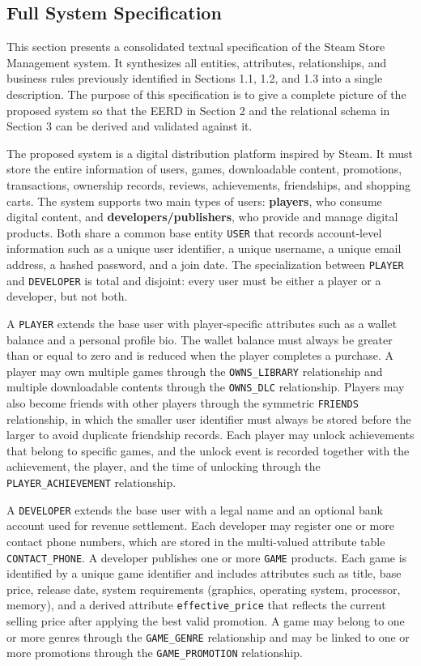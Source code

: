 \subsection{Full System Specification}

This section presents a consolidated textual specification of the Steam Store Management system. It synthesizes all entities, attributes, relationships, and business rules previously identified in Sections 1.1, 1.2, and 1.3 into a single description. The purpose of this specification is to give a complete picture of the proposed system so that the EERD in Section 2 and the relational schema in Section 3 can be derived and validated against it.

The proposed system is a digital distribution platform inspired by Steam. It must store the entire information of users, games, downloadable content, promotions, transactions, ownership records, reviews, achievements, friendships, and shopping carts. The system supports two main types of users: \textbf{players}, who consume digital content, and \textbf{developers/publishers}, who provide and manage digital products. Both share a common base entity \texttt{USER} that records account-level information such as a unique user identifier, a unique username, a unique email address, a hashed password, and a join date. The specialization between \texttt{PLAYER} and \texttt{DEVELOPER} is total and disjoint: every user must be either a player or a developer, but not both.

A \texttt{PLAYER} extends the base user with player-specific attributes such as a wallet balance and a personal profile bio. The wallet balance must always be greater than or equal to zero and is reduced when the player completes a purchase. A player may own multiple games through the \texttt{OWNS\_LIBRARY} relationship and multiple downloadable contents through the \texttt{OWNS\_DLC} relationship. Players may also become friends with other players through the symmetric \texttt{FRIENDS} relationship, in which the smaller user identifier must always be stored before the larger to avoid duplicate friendship records. Each player may unlock achievements that belong to specific games, and the unlock event is recorded together with the achievement, the player, and the time of unlocking through the \texttt{PLAYER\_ACHIEVEMENT} relationship.

A \texttt{DEVELOPER} extends the base user with a legal name and an optional bank account used for revenue settlement. Each developer may register one or more contact phone numbers, which are stored in the multi-valued attribute table \texttt{CONTACT\_PHONE}. A developer publishes one or more \texttt{GAME} products. Each game is identified by a unique game identifier and includes attributes such as title, base price, release date, system requirements (graphics, operating system, processor, memory), and a derived attribute \texttt{effective\_price} that reflects the current selling price after applying the best valid promotion. A game may belong to one or more genres through the \texttt{GAME\_GENRE} relationship and may be linked to one or more promotions through the \texttt{GAME\_PROMOTION} relationship.

